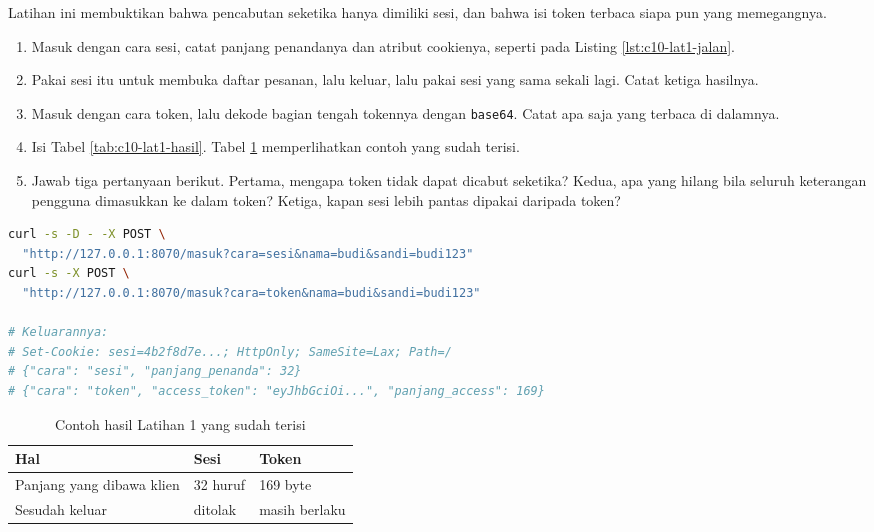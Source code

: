 Latihan ini membuktikan bahwa pencabutan seketika hanya dimiliki sesi, dan
bahwa isi token terbaca siapa pun yang memegangnya.

\begin{enumerate}
  \item Masuk dengan cara sesi, catat panjang penandanya dan atribut
        cookienya, seperti pada Listing \ref{lst:c10-lat1-jalan}.
  \item Pakai sesi itu untuk membuka daftar pesanan, lalu keluar, lalu
        pakai sesi yang sama sekali lagi. Catat ketiga hasilnya.
  \item Masuk dengan cara token, lalu dekode bagian tengah tokennya dengan
        \texttt{base64}. Catat apa saja yang terbaca di dalamnya.
  \item Isi Tabel \ref{tab:c10-lat1-hasil}. Tabel \ref{tab:c10-lat1-contoh}
        memperlihatkan contoh yang sudah terisi.
  \item Jawab tiga pertanyaan berikut. Pertama, mengapa token tidak dapat
        dicabut seketika? Kedua, apa yang hilang bila seluruh keterangan
        pengguna dimasukkan ke dalam token? Ketiga, kapan sesi lebih pantas
        dipakai daripada token?
\end{enumerate}

\begin{lstlisting}[language=bash, caption={Membandingkan sesi dan token, tersedia di \berkas{sources/chapter10/aplikasi.py}}, label={lst:c10-lat1-jalan}]
curl -s -D - -X POST \
  "http://127.0.0.1:8070/masuk?cara=sesi&nama=budi&sandi=budi123"
curl -s -X POST \
  "http://127.0.0.1:8070/masuk?cara=token&nama=budi&sandi=budi123"

# Keluarannya:
# Set-Cookie: sesi=4b2f8d7e...; HttpOnly; SameSite=Lax; Path=/
# {"cara": "sesi", "panjang_penanda": 32}
# {"cara": "token", "access_token": "eyJhbGciOi...", "panjang_access": 169}
\end{lstlisting}

\begin{table}[!htb]
  \centering
  \caption{Contoh hasil Latihan 1 yang sudah terisi}
  \label{tab:c10-lat1-contoh}
  \begin{tabularx}{\textwidth}{Xll}
    \hline
    \textbf{Hal} & \textbf{Sesi} & \textbf{Token} \\
    \hline
    Panjang yang dibawa klien & 32 huruf & 169 byte \\
    \hline
    Sesudah keluar & ditolak & masih berlaku \\
    \hline
  \end{tabularx}
\end{table}

